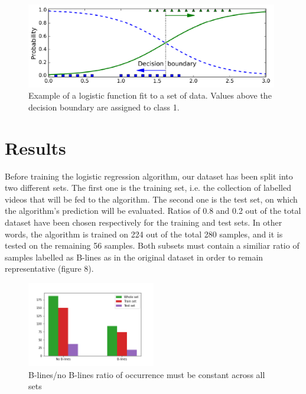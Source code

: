 \documentclass[12pt]{article} %
\begin{document}
	\begin{figure}
	\centering
	\includegraphics[width=11cm]{figuras/sigmoid.png}
	\caption{Example of a logistic function fit to a set of data. Values above the decision boundary are assigned to class 1. \cite{geron}}
	\end{figure}


\section{Results}

	Before training the logistic regression algorithm, our dataset has been split into two different sets. The first one is the training set, i.e. the collection of labelled videos that will be fed to the algorithm. The second one is the test set, on which the algorithm's prediction will be evaluated. Ratios of 0.8 and 0.2  out of the total dataset have been chosen respectively for the training and test sets. In other words, the algorithm is trained on 224 out of the total 280 samples, and it is tested on the remaining 56 samples. Both subsets must contain a similiar ratio of samples labelled as B-lines as in the original dataset in order to remain representative (figure 8). 
	
	\begin{figure}
	\centering
	\includegraphics[width=0.5\textwidth]{figuras/bline_ratio.png}
	\caption{B-lines/no B-lines ratio of occurrence must be constant across all 		sets}
	\end{figure}
\end{document}

